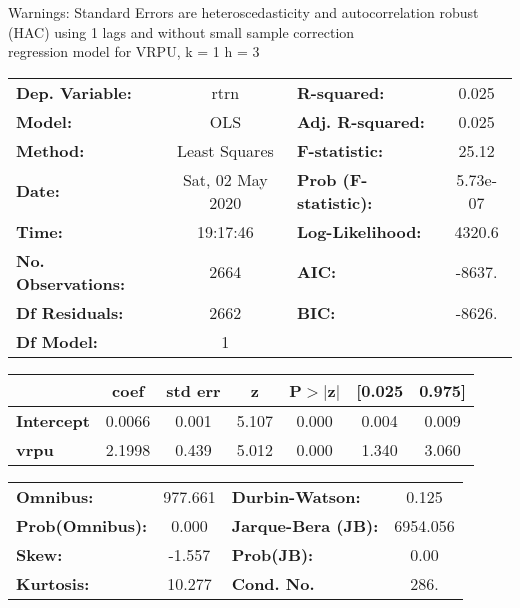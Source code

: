 Warnings: \newline
 [1] Standard Errors are heteroscedasticity and autocorrelation robust (HAC) using 1 lags and without small sample correction\\ 

regression model for VRPU, k = 1 h = 3\begin{center}
\begin{tabular}{lclc}
\toprule
\textbf{Dep. Variable:}    &       rtrn       & \textbf{  R-squared:         } &     0.025   \\
\textbf{Model:}            &       OLS        & \textbf{  Adj. R-squared:    } &     0.025   \\
\textbf{Method:}           &  Least Squares   & \textbf{  F-statistic:       } &     25.12   \\
\textbf{Date:}             & Sat, 02 May 2020 & \textbf{  Prob (F-statistic):} &  5.73e-07   \\
\textbf{Time:}             &     19:17:46     & \textbf{  Log-Likelihood:    } &    4320.6   \\
\textbf{No. Observations:} &        2664      & \textbf{  AIC:               } &    -8637.   \\
\textbf{Df Residuals:}     &        2662      & \textbf{  BIC:               } &    -8626.   \\
\textbf{Df Model:}         &           1      & \textbf{                     } &             \\
\bottomrule
\end{tabular}
\begin{tabular}{lcccccc}
                   & \textbf{coef} & \textbf{std err} & \textbf{z} & \textbf{P$> |$z$|$} & \textbf{[0.025} & \textbf{0.975]}  \\
\midrule
\textbf{Intercept} &       0.0066  &        0.001     &     5.107  &         0.000        &        0.004    &        0.009     \\
\textbf{vrpu}      &       2.1998  &        0.439     &     5.012  &         0.000        &        1.340    &        3.060     \\
\bottomrule
\end{tabular}
\begin{tabular}{lclc}
\textbf{Omnibus:}       & 977.661 & \textbf{  Durbin-Watson:     } &    0.125  \\
\textbf{Prob(Omnibus):} &   0.000 & \textbf{  Jarque-Bera (JB):  } & 6954.056  \\
\textbf{Skew:}          &  -1.557 & \textbf{  Prob(JB):          } &     0.00  \\
\textbf{Kurtosis:}      &  10.277 & \textbf{  Cond. No.          } &     286.  \\
\bottomrule
\end{tabular}
\end{center}

